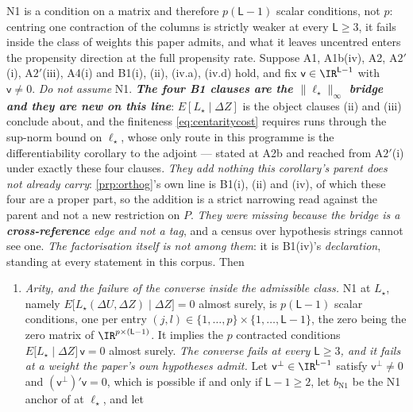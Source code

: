 \begin{corollary}\label{cor:centarity}
N1 is a condition on a matrix and therefore $p(\mathsf L-1)$ scalar conditions, not $p$: centring one
contraction of the columns is strictly weaker at every $\mathsf L\ge3$, it fails inside the class of
weights this paper admits, and what it leaves uncentred enters the propensity direction at the full
propensity rate.
Suppose A1, A1b(iv), A2, A$2'$(i), A$2'$(iii), A4(i) and B1(i), (ii), (iv.a), (iv.d) hold, and fix
$\mathsf v\in\IR^{\mathsf L-1}$
with $\mathsf v\ne0$. \emph{Do not assume} N1.
\emph{\textbf{The four B1 clauses are the $\|\ell_\star\|_\infty$ bridge and they are new on this line}}:
$E[L_\star\mid\Delta Z]$ is the object clauses \textup{(ii)} and \textup{(iii)} conclude about, and the
finiteness \eqref{eq:centaritycost} requires runs through the sup-norm bound on $\ell_\star$, whose only
route in this programme is the differentiability corollary to the adjoint --- stated at A2b and reached
from A$2'$(i) under exactly these four clauses. \emph{They add nothing this corollary's parent does not
already carry}: \cref{prp:orthog}'s own line is B1(i), (ii) and (iv), of which these four are a proper
part, so the addition is a strict narrowing read against the parent and not a new restriction on $P$.
\emph{They were missing because the bridge is a \textbf{cross-reference} edge and not a tag}, and a
census over hypothesis strings cannot see one. \emph{The factorisation itself is not among them}: it is
B1(iv)'s \emph{declaration}, standing at every statement in this corpus. Then
\begin{enumerate}
\item[(i)] \emph{Arity, and the failure of the converse inside the admissible class.} N1 at $L_\star$,
namely $E\big[L_\star(\Delta U,\Delta Z)\mid\Delta Z\big]=0$ almost surely, is $p(\mathsf L-1)$ scalar
conditions, one per entry $(j,l)\in\{1,\dots,p\}\times\{1,\dots,\mathsf L-1\}$, the zero being the zero
matrix of $\IR^{p\times(\mathsf L-1)}$. It implies the $p$ contracted conditions
$E\big[L_\star\mid\Delta Z\big]\,\mathsf v=0$ almost surely. \emph{The converse fails at every
$\mathsf L\ge3$, and it fails at a weight the paper's own hypotheses admit.} Let
$\mathsf v^{\perp}\in\IR^{\mathsf L-1}$ satisfy $\mathsf v^{\perp}\ne0$ and
$(\mathsf v^{\perp})'\mathsf v=0$, which is possible if and only if $\mathsf L-1\ge2$, let
$b_{\mathrm{N1}}$ be the N1 anchor of  at $\ell_\star$, and let

\end{enumerate}
\end{corollary}
